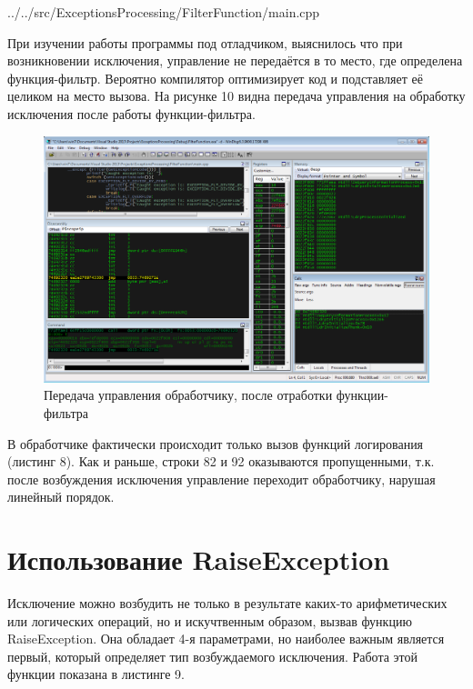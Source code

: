 \documentclass[a4paper, 12pt]{report}		%
\begin{document}

{../../src/ExceptionsProcessing/FilterFunction/main.cpp}

При изучении работы программы под отладчиком, выяснилось что при возникновении исключения, управление не передаётся в то место, где определена функция-фильтр. Вероятно компилятор оптимизирует код и подставляет её целиком на место вызова. На рисунке 10 видна передача управления на обработку исключения после работы функции-фильтра.

\begin{figure}[h!]
\centering
\includegraphics[scale=0.5]{res/003}
\caption{Передача управления обработчику, после отработки функции-фильтра}
\end{figure}

В обработчике фактически происходит только вызов функций логирования (листинг 8). Как и раньше, строки 82 и 92 оказываются пропущенными, т.к. после возбуждения исключения управление переходит обработчику, нарушая линейный порядок.




\chapter*{Использование RaiseException}

Исключение можно возбудить не только в результате каких-то арифметических или логических операций, но и искучтвенным образом, вызвав функцию RaiseException. Она обладает 4-я параметрами, но наиболее важным является первый, который определяет тип возбуждаемого исключения. Работа этой функции показана в листинге 9.
\end{document}
